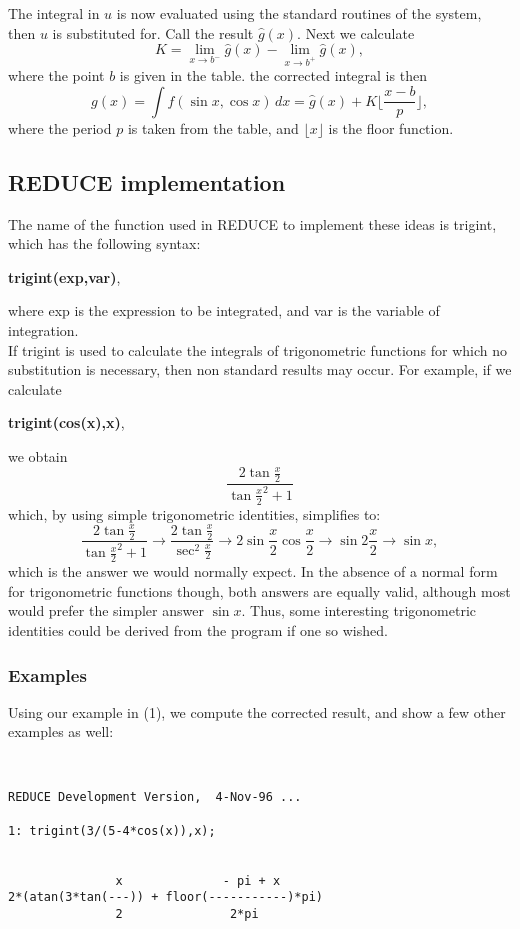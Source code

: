 The integral in $u$ is now evaluated using the standard routines of the system, then $u$ is substituted for. Call the result $\hat{g}(x)$. Next we calculate
 \[ K=\lim_{x \rightarrow b^{-}} \hat{g}(x) - \lim_{x \rightarrow b^{+}} \hat{g}(x), \]
where the point $b$ is given in the table. the corrected integral is then
\[ g(x)=\int f(\sin x,\cos x)\,dx = \hat{g}(x)+K\lfloor \frac{x-b}{p} \rfloor, \]
where the period $p$ is taken from the table, and $\lfloor x \rfloor$ is the floor function.

\subsection{REDUCE implementation}
The name of the function used in \small{REDUCE} \normalsize to implement these ideas is trigint, which has the following syntax:
\begin{center}  \textbf{trigint(exp,var)}, \end{center}
where exp is the expression to be integrated, and var is the variable of integration.  \\
If trigint is used to calculate the integrals of trigonometric functions for which no substitution is necessary, then non standard results may occur. For example, if we calculate
  \begin{center} \textbf{trigint(cos(x),x)}, \end{center}
we obtain 
\[ \frac{2\tan\frac{x}{2}}{\tan\frac{x}{2}^{2}+1} \]
which, by using simple trigonometric identities, simplifies to: 
\[  \frac{2\tan\frac{x}{2}}{\tan\frac{x}{2}^{2}+1} \rightarrow \frac{2\tan\frac{x}{2}}{\sec^{2}\frac{x}{2}} \rightarrow 2\sin\frac{x}{2}\cos\frac{x}{2} \rightarrow \sin 2\frac{x}{2} \rightarrow \sin x, \]
which is the answer we would normally expect. In the absence of a normal form for trigonometric functions though, both answers are equally valid, although most would prefer the simpler answer $\sin x.$ Thus, some interesting trigonometric identities could be derived from the program if one so wished. 
\subsubsection{Examples}
Using our example in (1), we compute the corrected result, and show a few other examples as well:
\begin{verbatim}


REDUCE Development Version,  4-Nov-96 ...

1: trigint(3/(5-4*cos(x)),x);


               x              - pi + x
2*(atan(3*tan(---)) + floor(-----------)*pi)
               2               2*pi

\end{verbatim}

